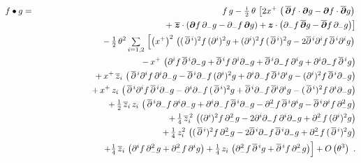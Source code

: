 \documentclass[11pt,a4paper]{article}
\def\d{\partial}
\newcommand{\1}{\mathbb{1}}
\newcommand{\mbf}[1]{{\boldsymbol {#1} }}
\def\ii{{\,{\rm i}\,}}
\def\mz{{\mbf z}}
\def\mdell{{\mbf\partial}}
\def\d{\partial}
\begin{document}
\begin{eqnarray}
  \label{eq:symtime:positionspace}\nonumber
  f\bullet g&=&f\,g-\mbox{$\frac{\ii}2$}\,\theta\,\left[
  2x^+\,\left(\,\overline{\mdell}f\cdot\mdell g
  - \mdell f\cdot\overline{\mdell}g\right)\right.\\\nonumber
  &&\qquad\qquad\quad\quad+\left.\overline{\mz}\cdot\left(\mdell f\,\d_- g
  - \d_- f\,\mdell g\right)+ \mz\cdot\left(\d_- f\,\overline{\mdell}g
   - \overline{\mdell}f\,\d_- g\right)\right]\\ \nonumber
  &&-\,\mbox{$\frac1{2}$}\,\theta^2\,\mbox{$\sum\limits_{i=1,2}$}\,
  \left[\left(x^+\right)^2\,\left((\,\overline{\d}{}^{\,i})^2f\,(\d^i)^2g
  +(\d^i)^2f\,(\,\overline{\d}{}^{\,i})^2g
  -2\overline{\d}{}^{\,i}\d^if\,\overline{\d}{}^{\,i}\d^ig
  \right)\right.\\ \nonumber &&\qquad\qquad\quad\quad
  -\,x^+\,\left(\d^if\,\overline{\d}{}^{\,i}\d_- g
  +\overline{\d}{}^{\,i}f\,\d^i\d_- g
  +\overline{\d}{}^{\,i}\d_- f\,\d^ig
  +\d^i\d_- f\,\overline{\d}{}^{\,i}g\right)\\ \nonumber
  &&\qquad\qquad\quad\quad
  +\,x^+\,\overline{z}_i\,\left(\,\overline{\d}{}^{\,i}\d^if\,\d^i\d_- g
  -\overline{\d}{}^{\,i}\d_- f\,(\d^i)^2g
  +\d^i\d_- f\,\overline{\d}{}^{\,i}\d^ig
  -(\d^i)^2f\,\overline{\d}{}^{\,i}\d_- g\right)
  \\ \nonumber &&\qquad\qquad\quad\quad
  +\,x^+\,z_i\,\left(\,\overline{\d}{}^{\,i}\d^if\,\overline{\d}{}^{\,i}\d_- g
  -\d^i\d_- f\,(\,\overline{\d}{}^{\,i})^2g
  +\overline{\d}{}^{\,i}\d_- f\,\overline{\d}{}^i\d^ig
  -(\,\overline{\d}{}^{\,i})^2f\,\d^i\d_- g\right)\\ \nonumber
  &&\qquad\qquad\quad\quad
  +\,\mbox{$\frac12$}\,\overline{z}_i\,z_i\,\left(\,
  \overline{\d}{}^{\,i}\d_- f\,\d^i\d_- g
  +\d^i\d_- f\,\overline{\d}{}^{\,i}\d_- g
  -\d_- ^2f\,\overline{\d}{}^{\,i}\d^ig
  -\overline{\d}{}^{\,i}\d^if\,\d_-^2g\right)
  \\ \nonumber &&\qquad\qquad\quad\quad
  +\,\mbox{$\frac14$}\,\overline{z}_i^{\,2}\,
  \left((\d^i)^2f\,\d_-^2g
  -2\d^i\d_- f\,\d^i\d_- g
  +\d_-^2f\,(\d^i)^2g\right)\\ \nonumber &&\qquad\qquad\quad\quad
  +\,\mbox{$\frac14$}\,z_i^2\,
  \left((\,\overline{\d}{}^{\,i})^2f\,\d_-^2g
  -2\overline{\d}{}^{\,i}\d_- f\,\overline{\d}{}^{\,i}\d_- g
  +\d_-^2f\,(\,\overline{\d}{}^{\,i})^2g\right)
  \\ \nonumber &&\qquad\qquad\quad\quad
  +\Bigl.\mbox{$\frac14$}\,\overline{z}_i\,\left(\d^if\,\d_-^2g
  +\d_-^2f\,\d^ig\right)
  +\mbox{$\frac14$}\,z_i\,\left(\d_-^2f\,\overline{\d}{}^{\,i}g
  +\overline{\d}{}^{\,i}f\,\d_-^2g\right)
  \Bigr]+O\left(\theta^3\right) \ . \\ &&
\end{eqnarray}
\end{document}
